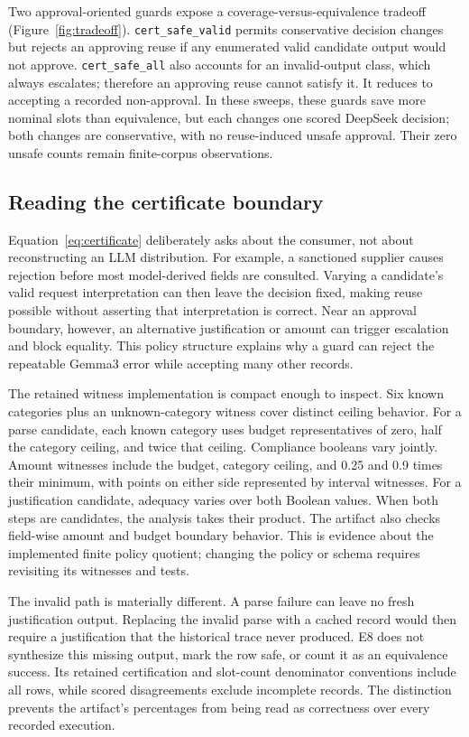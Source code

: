 Two approval-oriented guards expose a coverage-versus-equivalence tradeoff (Figure~\ref{fig:tradeoff}). \texttt{cert\_\allowbreak safe\_\allowbreak valid} permits conservative decision changes but rejects an approving reuse if any enumerated valid candidate output would not approve. \texttt{cert\_\allowbreak safe\_\allowbreak all} also accounts for an invalid-output class, which always escalates; therefore an approving reuse cannot satisfy it. It reduces to accepting a recorded non-approval. In these sweeps, these guards save more nominal slots than equivalence, but each changes one scored DeepSeek decision; both changes are conservative, with no reuse-induced unsafe approval. Their zero unsafe counts remain finite-corpus observations.



\iflongversion
\subsection{Reading the certificate boundary}
Equation~\ref{eq:certificate} deliberately asks about the consumer, not about reconstructing an LLM distribution. For example, a sanctioned supplier causes rejection before most model-derived fields are consulted. Varying a candidate's valid request interpretation can then leave the decision fixed, making reuse possible without asserting that interpretation is correct. Near an approval boundary, however, an alternative justification or amount can trigger escalation and block equality. This policy structure explains why a guard can reject the repeatable Gemma3 error while accepting many other records.

The retained witness implementation is compact enough to inspect. Six known categories plus an unknown-category witness cover distinct ceiling behavior. For a parse candidate, each known category uses budget representatives of zero, half the category ceiling, and twice that ceiling. Compliance booleans vary jointly. Amount witnesses include the budget, category ceiling, and 0.25 and 0.9 times their minimum, with points on either side represented by interval witnesses. For a justification candidate, adequacy varies over both Boolean values. When both steps are candidates, the analysis takes their product. The artifact also checks field-wise amount and budget boundary behavior. This is evidence about the implemented finite policy quotient; changing the policy or schema requires revisiting its witnesses and tests.

The invalid path is materially different. A parse failure can leave no fresh justification output. Replacing the invalid parse with a cached record would then require a justification that the historical trace never produced. E8 does not synthesize this missing output, mark the row safe, or count it as an equivalence success. Its retained certification and slot-count denominator conventions include all rows, while scored disagreements exclude incomplete records. The distinction prevents the artifact's percentages from being read as correctness over every recorded execution.

